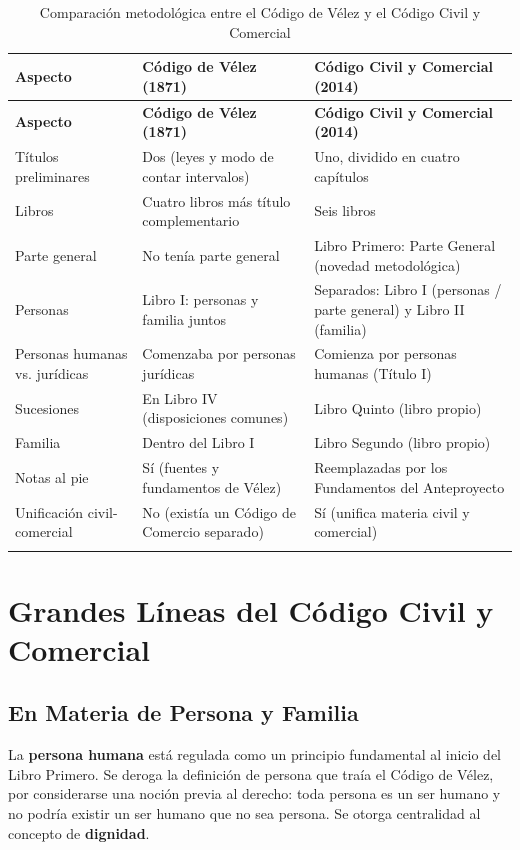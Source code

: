 \documentclass[12pt,oneside]{book}
\begin{document}
\begin{longtable}{@{}p{}p{}p{}@{}}
\toprule
\textbf{Aspecto} & \textbf{Código de Vélez (1871)} & \textbf{Código Civil y Comercial (2014)} \\
\midrule
\endfirsthead
\toprule
\textbf{Aspecto} & \textbf{Código de Vélez (1871)} & \textbf{Código Civil y Comercial (2014)} \\
\midrule
\endhead
Títulos preliminares & Dos (leyes y modo de contar intervalos) & Uno, dividido en cuatro capítulos \\
Libros & Cuatro libros más título complementario & Seis libros \\
Parte general & No tenía parte general & Libro Primero: Parte General (novedad metodológica) \\
Personas & Libro I: personas y familia juntos & Separados: Libro I (personas / parte general) y Libro II (familia) \\
Personas humanas vs. jurídicas & Comenzaba por personas jurídicas & Comienza por personas humanas (Título I) \\
Sucesiones & En Libro IV (disposiciones comunes) & Libro Quinto (libro propio) \\
Familia & Dentro del Libro I & Libro Segundo (libro propio) \\
Notas al pie & Sí (fuentes y fundamentos de Vélez) & Reemplazadas por los Fundamentos del Anteproyecto \\
Unificación civil-comercial & No (existía un Código de Comercio separado) & Sí (unifica materia civil y comercial) \\
\bottomrule
\caption{Comparación metodológica entre el Código de Vélez y el Código Civil y Comercial}
\end{longtable}

\section{Grandes Líneas del Código Civil y Comercial}

\subsection{En Materia de Persona y Familia}

La \textbf{persona humana} está regulada como un principio fundamental al inicio del Libro Primero. Se deroga la definición de persona que traía el Código de Vélez, por considerarse una noción previa al derecho: toda persona es un ser humano y no podría existir un ser humano que no sea persona. Se otorga centralidad al concepto de \textbf{dignidad}.
\end{document}
